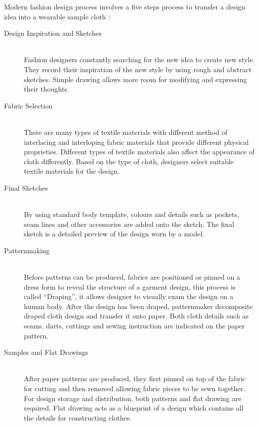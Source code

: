  Modern fashion design process involves a five steps process to transfer a design idea into a wearable sample cloth  :
\begin{description}
  \item[Design Inspiration and Sketches] \hfill \\
  Fashion designers constantly searching for the new idea to create new style. They record their inspiration of the new style by using rough and abstract sketches. Simple drawing allows more room for modifying and expressing their thoughts.

  \item[Fabric Selection] \hfill \\
  There are many types of textile materials with different method of interlacing and interloping fabric materials that provide different physical proprieties. Different types of textile materials also affect the appearance of cloth differently. Based on the type of cloth, designers select suitable textile materials for the design. 
  
   \item[Final Sketches] \hfill \\
  By using standard body template, colours and details such as pockets, seam lines and other accessories are added onto the sketch. The final sketch is a detailed preview of the design worn by a model. 
  
    \item[Patternmaking] \hfill \\
  Before patterns can be produced, fabrics are positioned or pinned on a dress form to reveal the structure of a garment design, this process is called ``Draping'', it allows designer to visually exam the design on a human body. After the design has been draped, patternmaker decomposite draped cloth design and transfer it onto paper. Both cloth details such as seams, darts, cuttings and sewing instruction are indicated on the paper pattern.
  
    \item[Samples and Flat Drawings] \hfill \\
	After paper patterns are produced, they first pinned on top of the fabric for cutting and then removed allowing fabric pieces to be sewn together. For design storage and distribution, both patterns and flat drawing are required. Flat drawing acts as a blueprint of a design which contains all the details for constructing clothes. 

\end{description}

